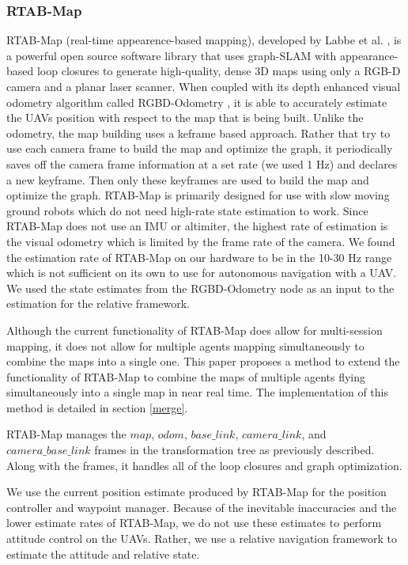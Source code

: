 \documentclass[letterpaper, 10 pt, conference]{ieeeconf}  %
\begin{document}
\subsubsection{RTAB-Map}

RTAB-Map (real-time appearence-based mapping), developed by Labbe et al. \cite{Labbe2011}\cite{Labbe2013}\cite{Labbe2019}, is a powerful open source software library that uses graph-SLAM with appearance-based loop closures to generate high-quality, dense 3D maps using only a RGB-D camera and a planar laser scanner. When coupled with its depth enhanced visual odometry algorithm called RGBD-Odometry \cite{Labbe2019}, it is able to accurately estimate the UAVs position with respect to the map that is being built. Unlike the odometry, the map building uses a keframe based approach. Rather that try to use each camera frame to build the map and optimize the graph, it periodically saves off the camera frame information at a set rate (we used 1 Hz) and declares a new keyframe.  Then only these keyframes are used to build the map and optimize the graph. RTAB-Map is primarily designed for use with slow moving ground robots which do not need high-rate state estimation to work. Since RTAB-Map does not use an IMU or altimiter, the highest rate of estimation is the visual odometry which is limited by the frame rate of the camera. We found the estimation rate of RTAB-Map on our hardware to be in the 10-30 Hz range which is not sufficient on its own to use for autonomous navigation with a UAV. We used the state estimates from the RGBD-Odometry node as an input to the estimation for the relative framework.

Although the current functionality of RTAB-Map does allow for multi-session mapping, it does not allow for multiple agents mapping simultaneously to combine the maps into a single one. This paper proposes a method to extend the functionality of RTAB-Map to combine the maps of multiple agents flying simultaneously into a single map in near real time. The implementation of this method is detailed in section \ref{merge}.

RTAB-Map manages the $\mathit{map}$, $\mathit{odom}$, $\mathit{base\_link}$, $\mathit{camera\_link}$, and $\mathit{camera\_base\_link}$ frames in the transformation tree as previously described. Along with the frames, it handles all of the loop closures and graph optimization.

We use the current position estimate produced by RTAB-Map for the position controller and waypoint manager. Because of the inevitable inaccuracies and the lower estimate rates of RTAB-Map, we do not use these estimates to perform attitude control on the UAVs. Rather, we use a relative navigation framework to estimate the attitude and relative state.
\end{document}
